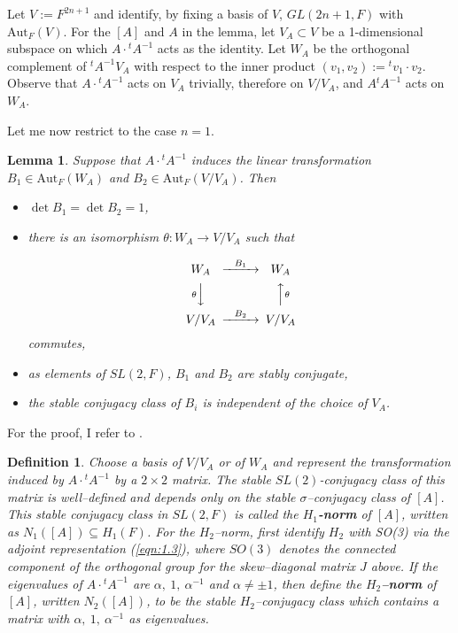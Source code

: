 \documentclass[12pt,letterpaper]{amsart}
\numberwithin{equation}{section}
\newtheorem{lemma}[theorem]{Lemma}
\newtheorem{definition}[theorem]{Definition}
\theoremstyle{definition}
\theoremstyle{plain}
\begin{document}
Let $V:=F^{2n+1}$ and identify, by fixing a basis of $V$, $GL(2n+1,F)$ with 
$\text{Aut}_F(V)$. For the $[A]$ and $A$ in the lemma, let 
$V_A \subset V$ be a 1-dimensional subspace on which $A\cdot {^{t}A^{-1}}$
acts as the identity. Let $W_A$ be the orthogonal complement of
${^{t}A^{-1}}V_A$ with respect to the inner product 
$(v_1,v_2) := {^{t}v_1\cdot v_2}$.
Observe that $A\cdot {^{t}A^{-1}}$ acts on $V_A$ trivially, 
therefore on $V/V_A$, and
$A{^{t}A^{-1}}$ acts on $W_A$. 
 
Let me now restrict to the case $n = 1$.

\begin{lemma}
\label{lemma:1.11} 
Suppose that $A\cdot {^{t}A^{-1}}$ induces the linear transformation
$B_1 \in \text{Aut}_F(W_A)$ and $B_2 \in \text{Aut}_F(V/V_A)$. Then

\begin{itemize}

\item[(a)] 
$\det B_1 = \det B_2 = 1$,

\item[(b)] 
there is an isomorphism $\theta : W_A \rightarrow V/V_A$ such that

\[
\begin{CD}
W_A @>B_1>>W_A\\
@V\theta VV @AA\theta A\\
V/V_A @>B_2>>V/V_A
\end{CD}
\]
commutes,

\item[(c)] 
as elements of $SL(2,F)$, $B_1$ and $B_2$ are stably conjugate,

\item[(d)] 
the stable conjugacy class of $B_i$ is independent of the choice 
of $V_A$.
\end{itemize}
\end{lemma}
 
For the proof, I refer to \cite{LaUn}.

\begin{definition}
\label{def:1.12} 
Choose a basis of $V/V_A$ or of $W_A$ and represent
the transformation induced by $A\cdot {^{t}A^{-1}}$ by a 
$2\times 2$ matrix. The stable
$SL(2)$-conjugacy class of this matrix is 
well--defined and depends only on the 
stable $\sigma$--conjugacy class of $[A]$. 
This stable conjugacy class in
$SL(2,F)$ is called the {\bf $H_1$-norm} of $[A]$, written as
$N_1([A]) \subseteq H_1(F)$. For the $H_2$--norm, first identify
$H_2$ with SO(3) via the adjoint representation (\ref{eqn:1.3}), 
where $SO(3)$ denotes the connected component of the orthogonal group for the 
skew--diagonal matrix $J$ above. If the eigenvalues of
$A\cdot {^{t}A^{-1}}$ are $\alpha,\ 1,\ \alpha^{-1}$ and 
$\alpha \not= \pm 1$, then
define the {\bf $H_2$--norm} of $[A]$, written $N_2([A])$, to be the
stable $H_2$--conjugacy class which contains a matrix with
$\alpha,\ 1,\ \alpha^{-1}$ as eigenvalues.
\end{definition}
 
\end{document}
